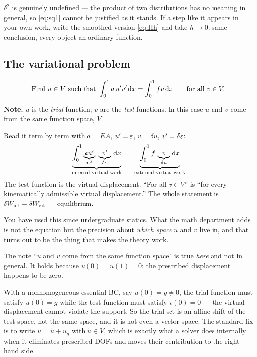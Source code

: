 \begin{pitfall}
$\delta^{2}$ is genuinely undefined --- the product of two distributions has no
meaning in general, so \eqref{eq:sq1} cannot be justified as it stands. If a
step like it appears in your own work, write the smoothed version
\eqref{eq:Hh} and take $h\to0$: same conclusion, every object an ordinary
function.
\end{pitfall}

\subsection*{The variational problem}

\begin{equation}\label{eq:varprob}
  \text{Find } u\in V \text{ such that }
  \int_{0}^{1} a\,u'v'\,\mathrm{d} x = \int_{0}^{1} f v\,\mathrm{d} x
  \qquad \text{for all } v\in V.
\end{equation}

\noindent\textbf{Note.} $u$ is the \emph{trial} function; $v$ are the
\emph{test} functions. In this case $u$ and $v$ come from the same function
space, $V$.

\begin{intuition}
Read it term by term with $a=EA$, $u'=\varepsilon$, $v=\delta u$, $v'=\delta\varepsilon$:
\[
  \underbrace{\int_{0}^{1} \underbrace{a u'}_{\sigma A}\;
    \underbrace{v'}_{\delta\varepsilon}\,\mathrm{d} x}_{\text{internal virtual work}}
  \;=\;
  \underbrace{\int_{0}^{1} f\,\underbrace{v}_{\delta u}\,\mathrm{d} x}_{\text{external virtual work}}
\]
The test function is the virtual displacement. ``For all $v\in V$'' is
``for every kinematically admissible virtual displacement.'' The whole statement
is $\delta W_{\text{int}} = \delta W_{\text{ext}}$ --- equilibrium.

You have used this since undergraduate statics. What the math department adds
is not the equation but the precision about \emph{which space} $u$ and $v$ live
in, and that turns out to be the thing that makes the theory work.
\end{intuition}

\begin{pitfall}[trial $=$ test only because the BCs are homogeneous]
The note ``$u$ and $v$ come from the same function space'' is true \emph{here}
and not in general. It holds because $u(0)=u(1)=0$: the prescribed displacement
happens to be zero.

With a nonhomogeneous essential BC, say $u(0)=g\ne0$, the trial function must
satisfy $u(0)=g$ while the test function must satisfy $v(0)=0$ --- the virtual
displacement cannot violate the support. So the trial set is an affine shift of
the test space, not the same space, and it is not even a vector space. The
standard fix is to write $u = \tilde u + u_{g}$ with $\tilde u\in V$, which is
exactly what a solver does internally when it eliminates prescribed DOFs and
moves their contribution to the right-hand side.
\end{pitfall}

